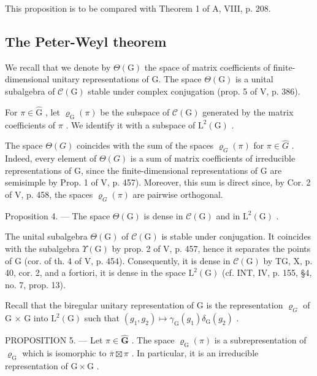 This proposition is to be compared with Theorem 1 of A, VIII, p. 208.

\subsection{The Peter-Weyl theorem}

We recall that we denote by \(\Theta(\mathrm{G})\) the space of matrix coefficients of finite-dimensional unitary representations of G. The space \(\Theta(\mathrm{G})\) is a unital subalgebra of \(\mathcal{C}(\mathrm{G})\) stable under complex conjugation (prop. 5 of V, p. 386).

For \(\pi \in \widehat{\mathrm{G}}\) , let \(\varrho_{\mathrm{G}}(\pi)\) be the subspace of \(\mathcal{C}(\mathrm{G})\) generated by the matrix coefficients of \(\pi\) . We identify it with a subspace of \(\mathrm{L}^2 (\mathrm{G})\) .

The space \(\Theta(G)\) coincides with the sum of the spaces \(\varrho_{G}(\pi)\) for \(\pi\in\widehat{G}\) . Indeed, every element of \(\Theta(G)\) is a sum of matrix coefficients of irreducible representations of G, since the finite-dimensional representations of G are semisimple by Prop. 1 of V, p. 457). Moreover, this sum is direct since, by Cor. 2 of V, p. 458, the spaces \(\varrho_{G}(\pi)\) are pairwise orthogonal.

Proposition 4. — The space \(\Theta(\mathrm{G})\) is dense in \(\mathcal{C}(\mathrm{G})\) and in \(\mathrm{L}^2(\mathrm{G})\) .

The unital subalgebra \(\Theta(\mathrm{G})\) of \(\mathcal{C}(\mathrm{G})\) is stable under conjugation. It coincides with the subalgebra \(\Upsilon(\mathrm{G})\) by prop. 2 of V, p. 457, hence it separates the points of G (cor. of th. 4 of V, p. 454). Consequently, it is dense in \(\mathcal{C}(\mathrm{G})\) by TG, X, p. 40, cor. 2, and a fortiori, it is dense in the space \(\mathrm{L}^2(\mathrm{G})\) (cf. INT, IV, p. 155, §4, no. 7, prop. 13).

Recall that the biregular unitary representation of G is the representation \(\varrho_{G}\) of G × G into \(\mathrm{L}^{2}(\mathrm{G})\) such that \((g_{1}, g_{2}) \mapsto \gamma_{\mathrm{G}}(g_{1}) \delta_{\mathrm{G}}(g_{2})\) .

PROPOSITION 5. --- Let \(\pi \in \widehat{\mathbf{G}}\) . The space \(\varrho_{\mathrm{G}}(\pi)\) is a subrepresentation of \(\varrho_{\mathrm{G}}\) which is isomorphic to \(\overline{\pi} \boxtimes \pi\) . In particular, it is an irreducible representation of \(\mathrm{G} \times \mathrm{G}\) .

